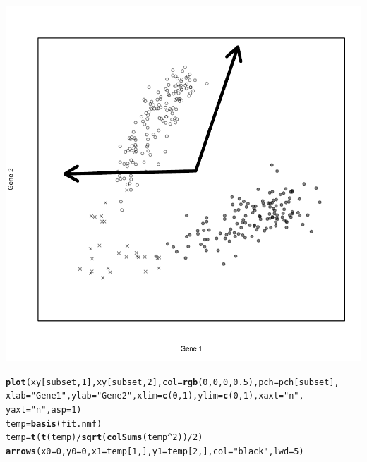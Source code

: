 \documentclass{article}\usepackage[]{graphicx}\usepackage[]{color}
\makeatletter
\def\maxwidth{ %
  \ifdim\Gin@nat@width>\linewidth
    \linewidth
  \else
    \Gin@nat@width
  \fi
}
\newcommand{\hlnum}[1]{\textcolor[rgb]{0.686,0.059,0.569}{#1}}%
\newcommand{\hlstr}[1]{\textcolor[rgb]{0.192,0.494,0.8}{#1}}%
\newcommand{\hlopt}[1]{\textcolor[rgb]{0,0,0}{#1}}%
\newcommand{\hlstd}[1]{\textcolor[rgb]{0.345,0.345,0.345}{#1}}%
\newcommand{\hlkwb}[1]{\textcolor[rgb]{0.69,0.353,0.396}{#1}}%
\newcommand{\hlkwc}[1]{\textcolor[rgb]{0.333,0.667,0.333}{#1}}%
\newcommand{\hlkwd}[1]{\textcolor[rgb]{0.737,0.353,0.396}{\textbf{#1}}}%
\newenvironment{kframe}{%
 \def\at@end@of@kframe{}%
 \ifinner\ifhmode%
  \def\at@end@of@kframe{\end{minipage}}%
  \begin{minipage}{\columnwidth}%
 \fi\fi%
 \def\FrameCommand##1{\hskip\@totalleftmargin \hskip-\fboxsep
 \colorbox{shadecolor}{##1}\hskip-\fboxsep
     \hskip-\linewidth \hskip-\@totalleftmargin \hskip\columnwidth}%
 \MakeFramed {\advance\hsize-\width
   \@totalleftmargin\z@ \linewidth\hsize
   \@setminipage}}%
 {\par\unskip\endMakeFramed%
 \at@end@of@kframe}
\newenvironment{knitrout}{}{} %
\makeatother
\begin{document}
\begin{knitrout}
{\centering \includegraphics[width=\maxwidth]{figure/plots-3} 

}


\begin{kframe}\begin{alltt}
\hlkwd{plot}\hlstd{(xy[subset,} \hlnum{1}\hlstd{], xy[subset,} \hlnum{2}\hlstd{],} \hlkwc{col} \hlstd{=} \hlkwd{rgb}\hlstd{(}\hlnum{0}\hlstd{,} \hlnum{0}\hlstd{,} \hlnum{0}\hlstd{,} \hlnum{0.5}\hlstd{),} \hlkwc{pch} \hlstd{= pch[subset],}
    \hlkwc{xlab} \hlstd{=} \hlstr{"Gene 1"}\hlstd{,} \hlkwc{ylab} \hlstd{=} \hlstr{"Gene 2"}\hlstd{,} \hlkwc{xlim} \hlstd{=} \hlkwd{c}\hlstd{(}\hlnum{0}\hlstd{,} \hlnum{1}\hlstd{),} \hlkwc{ylim} \hlstd{=} \hlkwd{c}\hlstd{(}\hlnum{0}\hlstd{,} \hlnum{1}\hlstd{),} \hlkwc{xaxt} \hlstd{=} \hlstr{"n"}\hlstd{,}
    \hlkwc{yaxt} \hlstd{=} \hlstr{"n"}\hlstd{,} \hlkwc{asp} \hlstd{=} \hlnum{1}\hlstd{)}
\hlstd{temp} \hlkwb{=} \hlkwd{basis}\hlstd{(fit.nmf)}
\hlstd{temp} \hlkwb{=} \hlkwd{t}\hlstd{(}\hlkwd{t}\hlstd{(temp)}\hlopt{/}\hlkwd{sqrt}\hlstd{(}\hlkwd{colSums}\hlstd{(temp}\hlopt{^}\hlnum{2}\hlstd{))}\hlopt{/}\hlnum{2}\hlstd{)}
\hlkwd{arrows}\hlstd{(}\hlkwc{x0} \hlstd{=} \hlnum{0}\hlstd{,} \hlkwc{y0} \hlstd{=} \hlnum{0}\hlstd{,} \hlkwc{x1} \hlstd{= temp[}\hlnum{1}\hlstd{, ],} \hlkwc{y1} \hlstd{= temp[}\hlnum{2}\hlstd{, ],} \hlkwc{col} \hlstd{=} \hlstr{"black"}\hlstd{,} \hlkwc{lwd} \hlstd{=} \hlnum{5}\hlstd{)}
\end{alltt}
\end{kframe}


\end{knitrout}
\end{document}
